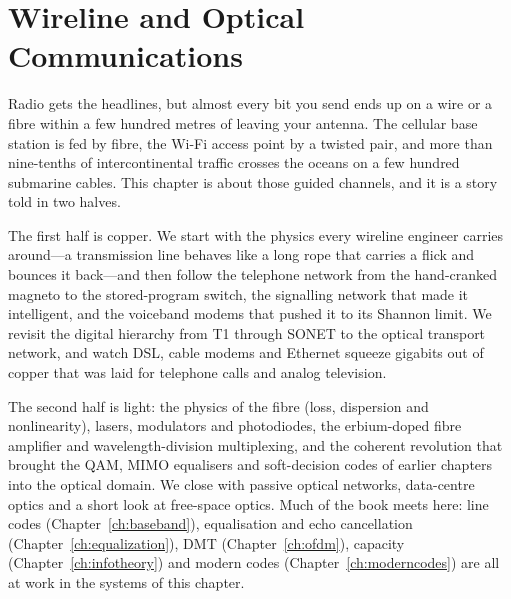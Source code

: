 \chapter{Wireline and Optical Communications}
\label{ch:wireline}

\begin{chapterintro}
Radio gets the headlines, but almost every bit you send ends up on a wire or a fibre within a
few hundred metres of leaving your antenna. The cellular base station is fed by fibre, the
Wi-Fi access point by a twisted pair, and more than nine-tenths of intercontinental traffic
crosses the oceans on a few hundred submarine cables. This chapter is about those guided
channels, and it is a story told in two halves.

The first half is copper. We start with the physics every wireline engineer carries around---a
transmission line behaves like a long rope that carries a flick and bounces it back---and then
follow the telephone network from the hand-cranked magneto to the stored-program switch, the
signalling network that made it intelligent, and the voiceband modems that pushed it to its
Shannon limit. We revisit the digital hierarchy from T1 through SONET to the optical transport
network, and watch DSL, cable modems and Ethernet squeeze gigabits out of copper that was laid
for telephone calls and analog television.

The second half is light: the physics of the fibre (loss, dispersion and nonlinearity), lasers,
modulators and photodiodes, the erbium-doped fibre amplifier and wavelength-division
multiplexing, and the coherent revolution that brought the QAM, MIMO equalisers and
soft-decision codes of earlier chapters into the optical domain. We close with passive optical
networks, data-centre optics and a short look at free-space optics. Much of the book meets here:
line codes (Chapter~\ref{ch:baseband}), equalisation and echo cancellation
(Chapter~\ref{ch:equalization}), DMT (Chapter~\ref{ch:ofdm}), capacity
(Chapter~\ref{ch:infotheory}) and modern codes (Chapter~\ref{ch:moderncodes}) are all at work in
the systems of this chapter.
\end{chapterintro}


